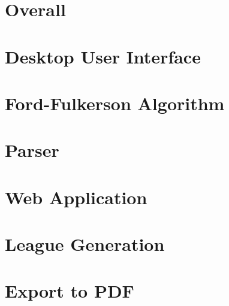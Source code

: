 \section{Overall}


\newpage

\section{Desktop User Interface}


\newpage

\section{Ford-Fulkerson Algorithm}
\label{sec:fordFulkersonAlgorithm}


\newpage

\section{Parser}


\newpage

\section{Web Application}


\newpage

\section{League Generation}


\newpage

\section{Export to PDF}

